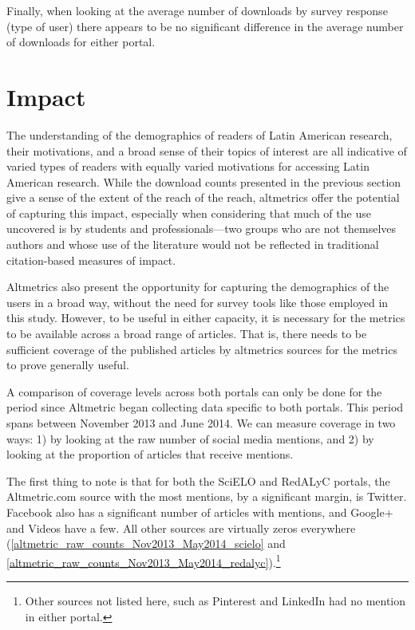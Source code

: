 Finally, when looking at the average number of downloads by survey response (type of user) there appears to be no significant difference in the average number of downloads for either portal.

\section{Impact}
\label{impact}

The understanding of the demographics of readers of Latin American research, their motivations, and a broad sense of their topics of interest are all indicative of varied types of readers with equally varied motivations for accessing Latin American research. While the download counts presented in the previous section give a sense of the extent of the reach of the reach, altmetrics offer the potential of capturing this impact, especially when considering that much of the use uncovered is by students and professionals—two groups who are not themselves authors and whose use of the literature would not be reflected in traditional citation-based measures of impact.

Altmetrics also present the opportunity for capturing the demographics of the users in a broad way, without the need for survey tools like those employed in this study. However, to be useful in either capacity, it is necessary for the metrics to be available across a broad range of articles. That is, there needs to be sufficient coverage of the published articles by altmetrics sources for the metrics to prove generally useful.

A comparison of coverage levels across both portals can only be done for the period since Altmetric began collecting data specific to both portals. This period spans between November 2013 and June 2014. We can measure coverage in two ways: 1) by looking at the raw number of social media mentions, and 2) by looking at the proportion of articles that receive mentions.

The first thing to note is that for both the SciELO and RedALyC portals, the Altmetric.com source with the most mentions, by a significant margin, is Twitter. Facebook also has a significant number of articles with mentions, and Google+ and Videos have a few. All other sources are virtually zeros everywhere (\autoref{altmetric_raw_counts_Nov2013_May2014_scielo} and \autoref{altmetric_raw_counts_Nov2013_May2014_redalyc}).\footnote{Other sources not listed here, such as Pinterest and LinkedIn had no mention in either portal.}

